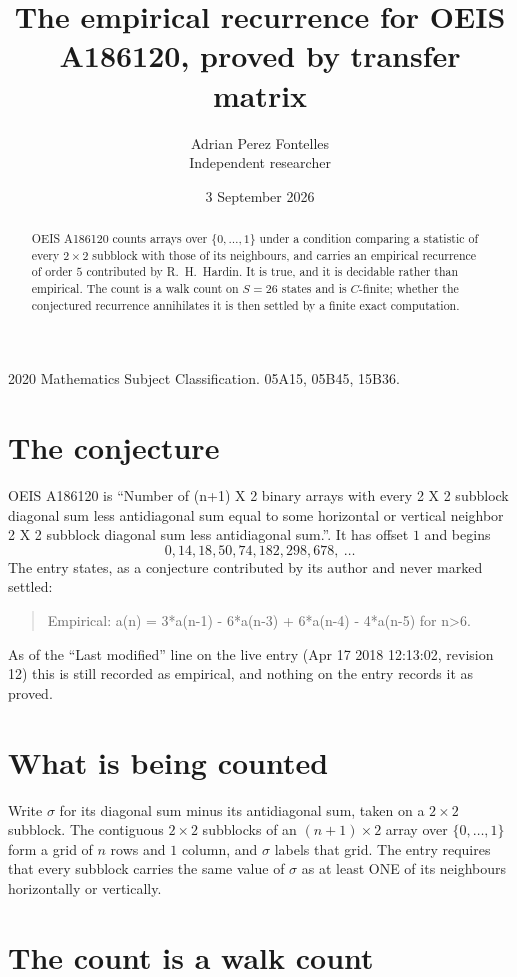 \documentclass[11pt,a4paper]{article}
\title{The empirical recurrence for OEIS A186120, proved by transfer matrix}
\author{Adrian Perez Fontelles\\ \small Independent researcher}
\date{3 September 2026}
\theoremstyle{plain}
\theoremstyle{definition}
\begin{document}
\maketitle

\begin{abstract}
OEIS A186120 counts arrays over $\{0,\dots,1\}$ under a condition comparing a statistic of
every $2\times2$ subblock with those of its neighbours, and carries an empirical recurrence
of order $5$ contributed by R.~H.~Hardin. It is true, and it is decidable rather than
empirical. The count is a walk count on $S=26$ states and is $C$-finite; whether the
conjectured recurrence annihilates it is then settled by a finite exact computation.
\end{abstract}

\noindent\small 2020 Mathematics Subject Classification. 05A15, 05B45, 15B36.\normalsize

\section{The conjecture}

OEIS A186120 is ``Number of (n+1) X 2 binary arrays with every 2 X 2 subblock diagonal sum less antidiagonal sum equal to some horizontal or vertical neighbor 2 X 2 subblock diagonal sum less antidiagonal sum.''. It has offset $1$ and begins
\[
0, 14, 18, 50, 74, 182, 298, 678,\ \dots
\]
The entry states, as a conjecture contributed by its author and never marked settled:
\begin{quote}
Empirical: a(n) = 3*a(n-1) - 6*a(n-3) + 6*a(n-4) - 4*a(n-5) for n>6.
\end{quote}
As of the ``Last modified'' line on the live entry (Apr 17 2018 12:13:02, revision 12) this is still
recorded as empirical, and nothing on the entry records it as proved.

\section{What is being counted}

Write $\sigma$ for its diagonal sum minus its antidiagonal sum, taken on a $2\times2$ subblock. The contiguous $2\times2$
subblocks of an $(n+1)\times2$ array over $\{0,\dots,1\}$ form a grid of $n$ rows
and $1$ column, and $\sigma$ labels that grid. The entry
requires that every subblock carries the same value of $\sigma$ as at least ONE of its neighbours horizontally or vertically.

\section{The count is a walk count}
\end{document}
